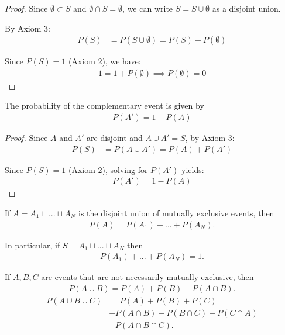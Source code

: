 \begin{proof}
	Since $\emptyset \subset S$ and $\emptyset \cap S = \emptyset$, we can write $S = S \cup \emptyset$ as a disjoint union.
	
	By Axiom 3:
	\begin{align}
		P(S) &= P(S \cup \emptyset) = P(S) + P(\emptyset)
	\end{align}
	
	Since $P(S) = 1$ (Axiom 2), we have:
	\begin{align}
		1 = 1 + P(\emptyset) \implies P(\emptyset) = 0
	\end{align}
\end{proof}


\begin{theorem}
	\label{thm:2.2.4} The probability of the complementary event is given by
	\begin{align}
		\label{eq:2.2.6}
		P(A')=1-P(A)
	\end{align}
\end{theorem}

\begin{proof}
	Since $A$ and $A'$ are disjoint and $A \cup A' = S$, by Axiom 3:
	\begin{align}
		P(S) &= P(A \cup A') = P(A) + P(A')
	\end{align}
	
	Since $P(S) = 1$ (Axiom 2), solving for $P(A')$ yields:
	\begin{align}
		P(A') = 1 - P(A)
	\end{align}
\end{proof}

\begin{theorem}
	\label{thm:2.2.5} If $A=A_{1}\sqcup...\sqcup A_{N}$ is the disjoint union of mutually exclusive events, then
	\begin{align}
		\label{eq:2.2.7}
		P(A)=P(A_{1})+...+P(A_{N}).
	\end{align}


	In particular, if $S=A_{1}\sqcup...\sqcup A_{N}$ then
	\begin{align}
		\label{eq:2.2.8}
		P(A_{1})+...+P(A_{N})=1.
	\end{align}
\end{theorem}


\begin{theorem}
	\label{thm:2.2.6}
	If $A,B,C$ are events that are not necessarily mutually exclusive, then
	\begin{align}
		\label{eq:2.2.9}
		P(A\cup B)=P(A)+P(B)-P(A\cap B).
	\end{align}
	\begin{align}
		\label{eq:2.2.10}
		P(A\cup B \cup C)&=P(A)+P(B)+P(C)\\
		&-P(A\cap B)-P(B\cap C)-P(C\cap A)\\
		&+P(A\cap B \cap C).
	\end{align}
\end{theorem}




